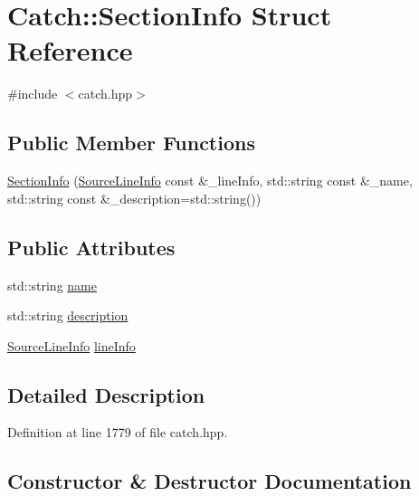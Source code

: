 \hypertarget{struct_catch_1_1_section_info}{}\section{Catch\+:\+:Section\+Info Struct Reference}
\label{struct_catch_1_1_section_info}


{\ttfamily \#include $<$catch.\+hpp$>$}

\subsection*{Public Member Functions}
\begin{DoxyCompactItemize}
\item 
\mbox{\hyperlink{struct_catch_1_1_section_info_a27aff3aaf8b6611f3651b17111a272c6}{Section\+Info}} (\mbox{\hyperlink{struct_catch_1_1_source_line_info}{Source\+Line\+Info}} const \&\+\_\+line\+Info, std\+::string const \&\+\_\+name, std\+::string const \&\+\_\+description=std\+::string())
\end{DoxyCompactItemize}
\subsection*{Public Attributes}
\begin{DoxyCompactItemize}
\item 
std\+::string \mbox{\hyperlink{struct_catch_1_1_section_info_a704c8fc662d309137e0d4f199cb7df58}{name}}
\item 
std\+::string \mbox{\hyperlink{struct_catch_1_1_section_info_a0052060219a6de74bb7ade34d4163a4e}{description}}
\item 
\mbox{\hyperlink{struct_catch_1_1_source_line_info}{Source\+Line\+Info}} \mbox{\hyperlink{struct_catch_1_1_section_info_adbc83b8a3507c4acc8ee249e93465711}{line\+Info}}
\end{DoxyCompactItemize}


\subsection{Detailed Description}


Definition at line 1779 of file catch.\+hpp.



\subsection{Constructor \& Destructor Documentation}
\mbox{\label{struct_catch_1_1_section_info_a27aff3aaf8b6611f3651b17111a272c6}} 
